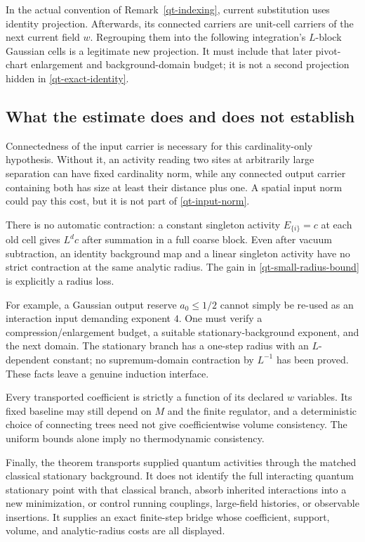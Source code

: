 In the actual convention of Remark~\ref{qt-indexing}, current
substitution uses identity projection. Afterwards, its connected
carriers are unit-cell carriers of the next current field $w$.
Regrouping them into the following integration's $L$-block Gaussian
cells is a legitimate new projection. It must include that later
pivot-chart enlargement and background-domain budget; it is not
a second projection hidden in \eqref{qt-exact-identity}.

\subsection{What the estimate does and does not establish}

Connectedness of the input carrier is necessary for this
cardinality-only hypothesis. Without it, an activity reading two
sites at arbitrarily large separation can have fixed cardinality
norm, while any connected output carrier containing both has size
at least their distance plus one. A spatial input norm could pay
this cost, but it is not part of \eqref{qt-input-norm}.

There is no automatic contraction: a constant singleton activity
$E_{\{i\}}=c$ at each old cell gives $L^d c$ after summation in
a full coarse block. Even after vacuum subtraction, an identity
background map and a linear singleton activity have no strict
contraction at the same analytic radius. The gain in
\eqref{qt-small-radius-bound} is explicitly a radius loss.

For example, a Gaussian output reserve $a_0\le1/2$ cannot simply
be re-used as an interaction input demanding exponent $4$.
One must verify a compression/enlargement budget, a suitable
stationary-background exponent, and the next domain. The
stationary branch has a one-step radius with an $L$-dependent
constant; no supremum-domain contraction by $L^{-1}$ has been
proved. These facts leave a genuine induction interface.

Every transported coefficient is strictly a function of its
declared $w$ variables. Its fixed baseline may still depend on
$M$ and the finite regulator, and a deterministic choice of
connecting trees need not give coefficientwise volume consistency.
The uniform bounds alone imply no thermodynamic consistency.

Finally, the theorem transports supplied quantum activities
through the matched classical stationary background. It does
not identify the full interacting quantum stationary point with
that classical branch, absorb inherited interactions into a new
minimization, or control running couplings, large-field histories,
or observable insertions. It supplies an exact finite-step bridge
whose coefficient, support, volume, and analytic-radius costs
are all displayed.
